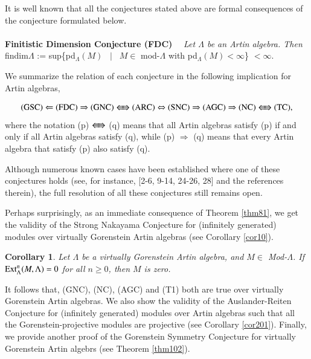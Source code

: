 \documentclass[11pt,a4paper]{article}
\newtheorem{cor}[thm]{Corollary}
\begin{document}
It is well known that all the conjectures stated above are formal consequences of the conjecture formulated below.
\\
\\
{\bf Finitistic Dimension Conjecture (FDC) }\ \ {\it  Let   $\Lambda$  be    an Artin algebra. Then} findim$\Lambda$ := sup\{pd$_{\Lambda}(M)$ \ $|$ \ $M \in$  mod-$\Lambda$ with pd$_{\Lambda}(M)    < \infty$\} $< \infty$.
\\
\par
We summarize the relation of each conjecture in the following implication for Artin algebras,

 $${\rm(GSC)} \Leftarrow{\rm (FDC)}\Rightarrow {\rm (GNC)}   \Lleftarrow\mspace{-6mu}\Rrightarrow {\rm (ARC)} \Leftrightarrow {\rm (SNC)} \Rightarrow {\rm (AGC)}\Rightarrow {\rm (NC)} \Lleftarrow\mspace{-6mu}\Rrightarrow {\rm (TC),  }  $$
 where the notation (p) $\Lleftarrow\mspace{-6mu}\Rrightarrow $ (q) means that all  Artin algebras satisfy (p) if and only if all  Artin algebras satisfy (q), while (p) $\Rightarrow$ (q)  means that   every Artin algebra that  satisfy (p) also satisfy (q).

Although numerous known cases have been established where one of these conjectures holds (see, for instance, [2-6, 9-14, 24-26,   28] and the references therein),
the full resolution of all these conjectures still remains open.


Perhaps surprisingly,  as an immediate consequence of Theorem \ref{thm81}, we get the  validity of the Strong Nakayama Conjecture for
(infinitely generated) modules over virtually Gorenstein Artin  algebras (see Corollary \ref{cor10}).

\begin{cor}\label{cor881}   Let  $\Lambda$ be a virtually Gorenstein Artin  algebra,  and    $M\in $  {\rm Mod}-$\Lambda$. If ${\rm Ext}_{\Lambda}^{n}(M, \Lambda)=0$  for
 all $n \geq 0$, then $M  $ is zero.\end{cor}


It follows  that,    (GNC),  (NC), (AGC) and (T1) both are true over      virtually Gorenstein Artin  algebras.
We also  show  the  validity  of the Auslander-Reiten  Conjecture for (infinitely generated) modules over  Artin algebras such that all the Gorenstein-projective modules are
projective  (see Corollary  \ref{cor201}).
Finally, we provide another proof of the Gorenstein Symmetry Conjecture for virtually Gorenstein Artin algebrs (see  Theorem \ref{thm102}).
\end{document}

